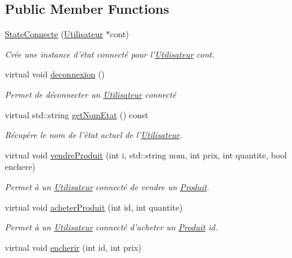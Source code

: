 \subsection*{Public Member Functions}
\begin{DoxyCompactItemize}
\item 
\hyperlink{classStateConnecte_a50922448c2191a173fae252dc32bc249}{State\-Connecte} (\hyperlink{classUtilisateur}{Utilisateur} $\ast$cont)
\begin{DoxyCompactList}\small\item\em Crée une instance d'état connecté pour l'\hyperlink{classUtilisateur}{Utilisateur} cont. \end{DoxyCompactList}\item 
\hypertarget{classStateConnecte_a2d03971c5edf05616d2faa5afba90925}{virtual void \hyperlink{classStateConnecte_a2d03971c5edf05616d2faa5afba90925}{deconnexion} ()}\label{classStateConnecte_a2d03971c5edf05616d2faa5afba90925}

\begin{DoxyCompactList}\small\item\em Permet de déconnecter un \hyperlink{classUtilisateur}{Utilisateur} connecté \end{DoxyCompactList}\item 
virtual std\-::string \hyperlink{classStateConnecte_aba8d7baa6105179fc820488532ee6914}{get\-Nom\-Etat} () const 
\begin{DoxyCompactList}\small\item\em Récupère le nom de l'état actuel de l'\hyperlink{classUtilisateur}{Utilisateur}. \end{DoxyCompactList}\item 
virtual void \hyperlink{classStateConnecte_a2c51f0790e9def5f4dcce2195af6c550}{vendre\-Produit} (int i, std\-::string nom, int prix, int quantite, bool enchere)
\begin{DoxyCompactList}\small\item\em Permet à un \hyperlink{classUtilisateur}{Utilisateur} connecté de vendre un \hyperlink{classProduit}{Produit}. \end{DoxyCompactList}\item 
\hypertarget{classStateConnecte_ab23a2c01a9e9a8116fa0add4a10cc798}{virtual void \hyperlink{classStateConnecte_ab23a2c01a9e9a8116fa0add4a10cc798}{acheter\-Produit} (int id, int quantite)}\label{classStateConnecte_ab23a2c01a9e9a8116fa0add4a10cc798}

\begin{DoxyCompactList}\small\item\em Permet à un \hyperlink{classUtilisateur}{Utilisateur} connecté d'acheter un \hyperlink{classProduit}{Produit} id. \end{DoxyCompactList}\item 
\hypertarget{classStateConnecte_a089f92126a87eaab2d4f070a9cdbdab9}{virtual void \hyperlink{classStateConnecte_a089f92126a87eaab2d4f070a9cdbdab9}{encherir} (int id, int prix)}\label{classStateConnecte_a089f92126a87eaab2d4f070a9cdbdab9}


\end{DoxyCompactItemize}
